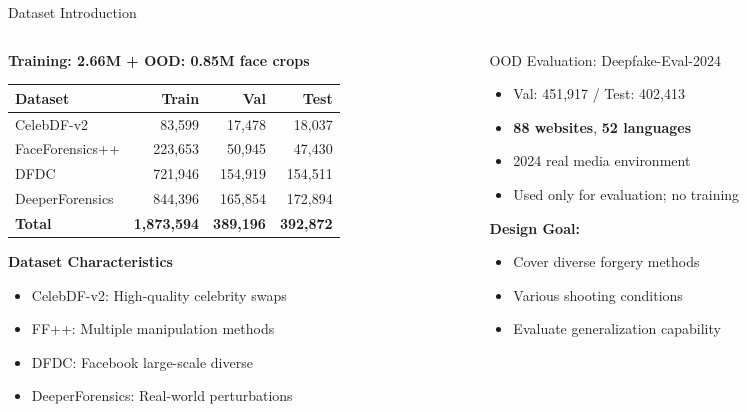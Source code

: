 \documentclass[aspectratio=169,12pt]{beamer}
\newcommand{\highlight}[1]{\textcolor{primaryblue}{\textbf{#1}}}
\begin{document}
\begin{frame}{Dataset Introduction}
\begin{columns}[T]
\begin{column}{0.55\textwidth}
\textbf{Training: 2.66M + OOD: 0.85M face crops}

\begin{center}
\scriptsize
\begin{tabular}{lrrr}
\toprule
\textbf{Dataset} & \textbf{Train} & \textbf{Val} & \textbf{Test} \\
\midrule
CelebDF-v2 & 83,599 & 17,478 & 18,037 \\
FaceForensics++ & 223,653 & 50,945 & 47,430 \\
DFDC & 721,946 & 154,919 & 154,511 \\
DeeperForensics & 844,396 & 165,854 & 172,894 \\
\midrule
\textbf{Total} & \textbf{1,873,594} & \textbf{389,196} & \textbf{392,872} \\
\bottomrule
\end{tabular}
\end{center}

\textbf{Dataset Characteristics}
\begin{itemize}
    \item CelebDF-v2: High-quality celebrity swaps
    \item FF++: Multiple manipulation methods
    \item DFDC: Facebook large-scale diverse
    \item DeeperForensics: Real-world perturbations
\end{itemize}
\end{column}

\begin{column}{0.45\textwidth}
\begin{block}{OOD Evaluation: Deepfake-Eval-2024}
\begin{itemize}
    \item Val: 451,917 / Test: 402,413
    \item \highlight{88 websites}, \highlight{52 languages}
    \item 2024 real media environment
    \item Used only for evaluation; no training
\end{itemize}
\end{block}

\textbf{Design Goal:}
\begin{itemize}
    \item Cover diverse forgery methods
    \item Various shooting conditions
    \item Evaluate generalization capability
\end{itemize}
\end{column}
\end{columns}
\end{frame}
\end{document}
